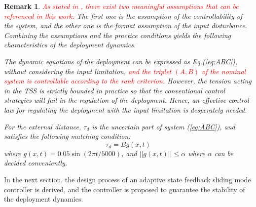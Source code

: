 \documentclass[3p]{elsarticle}
\theoremstyle{plain}
\newtheorem{myrem}{Remark}
\begin{document}
\begin{myrem}
\textcolor{red}{As stated in \cite{Hu2008Robust}, there exist two meaningful assumptions that can be referenced in this work.} The first one is the assumption of the controllability of the system, and the other one is the format assumption of the input disturbance. Combining the assumptions and the practice conditions yields the following characteristics of the deployment dynamics.\par
The dynamic equations of the deployment can be expressed as Eq.(\ref{eq:ABC}), without considering the input limitation, \textcolor{red}{and the triplet $(A,B)$ of the nominal system is controllable according to the rank criterion.} However, the tension acting in the TSS is strictly bounded in practice so that the conventional control strategies will fail in the regulation of the deployment. Hence, an effective control law for regulating the deployment with the input limitation is desperately needed.\par
For the external distance, $\tau_d$ is the uncertain part of system (\ref{eq:ABC}), and satisfies the following matching condition:
\begin{equation}
\tau_d=Bg(x,t)
\end{equation}
where $g(x,t) = 0.05\sin(2\pi t /5000)$, and $||g(x,t)||\le \alpha$ where $\alpha$ can be decided conveniently.
\label{as:1}
\end{myrem}
In the next section, the design process of an adaptive state feedback sliding mode controller is derived, and the controller is proposed to guarantee the stability of the deployment dynamics.
\end{document}
